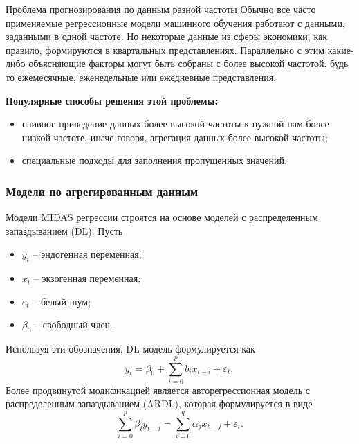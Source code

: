 \documentclass[notheorems, 10pt]{beamer}
\renewcommand{\epsilon}{\varepsilon}
\begin{document}
\begin{frame}
	{Проблема прогнозирования по данным разной частоты}
	Обычно все часто применяемые регрессионные модели машинного обучения работают с данными, заданными в одной частоте. Но некоторые данные из сферы экономики, как правило, формируются в квартальных представлениях. Параллельно с этим какие-либо объясняющие факторы могут быть собраны с более высокой частотой, будь то ежемесячные, еженедельные или ежедневные представления.
	
	\textbf{Популярные способы решения этой проблемы:}
	\begin{itemize}
		\item наивное приведение данных более высокой частоты к нужной нам более низкой частоте, иначе говоря, агрегация данных более высокой частоты;
		\item специальные подходы для заполнения пропущенных значений.
	\end{itemize}
\end{frame}
\begin{frame}
	\frametitle{Модели по агрегированным данным}
	Модели MIDAS регрессии строятся на основе моделей с распределенным запаздыванием (DL). Пусть
	\begin{itemize}
		\item $y_t$ -- эндогенная переменная;
		\item $x_t$ -- экзогенная переменная;
		\item $\epsilon_t$ -- белый шум;
		\item $\beta_0$ -- свободный член.
	\end{itemize}
	Используя эти обозначения, DL-модель формулируется как
	\begin{equation}
		y_t = \beta_0 + \sum_{i=0}^{p} b_i x_{t-i} + \epsilon_t,
	\end{equation}
	Более продвинутой модификацией является авторегрессионная модель с распределенным запаздыванием (ARDL), которая формулируется в виде
	\begin{equation}
		\sum_{i=0}^{p} \beta_i y_{t-i}= \sum_{i=0}^{q}\alpha_j x_{t-j}+ \epsilon_t.
	\end{equation}
\end{frame}
\end{document}
